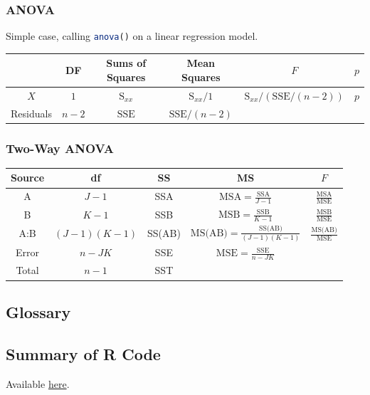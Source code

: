 \documentclass[12pt]{article}
\begin{document}
\subsubsection{ANOVA}
Simple case, calling \lstinline[language=R]{anova()} on a linear regression model.
\begin{center}
    \begin{tabular}{c | c | c | c | c | c} 
        & DF & Sums of Squares & Mean Squares & $F$ & $p$ \\
        \hline
        $X$ & $1$ & $\text{S}_{xx}$ & $\text{S}_{xx}/1$ & $\text{S}_{xx}/(\text{SSE}/(n-2))$ & $p$ \\
        Residuals & $n-2$ & $\text{SSE}$ & $\text{SSE}/(n-2)$ & &\\
    \end{tabular}
\end{center}

\subsubsection{Two-Way ANOVA}

\begin{center}
\begin{tabular}{c c c c c}
    Source & df & SS & MS & $F$\\
    \hline
    A & $J-1$ & SSA & $\text{MSA} = \frac{\text{SSA}}{J-1}$ & $\frac{\text{MSA}}{\text{MSE}}$\\
    B & $K-1$ & SSB & $\text{MSB} = \frac{\text{SSB}}{K-1}$ & $\frac{\text{MSB}}{\text{MSE}}$\\
    A:B & $(J-1)(K-1)$ & SS(AB) & $\text{MS(AB)} = \frac{\text{SS(AB)}}{(J-1)(K-1)}$ & $\frac{\text{MS(AB)}}{\text{MSE}}$\\
    Error & $n - JK$ & SSE & $\text{MSE} = \frac{\text{SSE}}{n - JK}$ & \\
    \hline
    Total & $n-1$ & SST & & \\
\end{tabular}
\end{center}

\subsection{Glossary}

\printProofs

\subsection{Summary of R Code}

Available \href{https://louismeunier.net/math/stats/}{here}.
\end{document}
